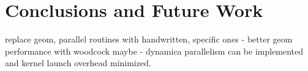 \chapter{Conclusions and Future Work}



replace geom, parallel routines with handwritten, specific ones
- better geom performance with woodcock maybe
- dynamica parallelism can be implemented and kernel launch overhead minimized.